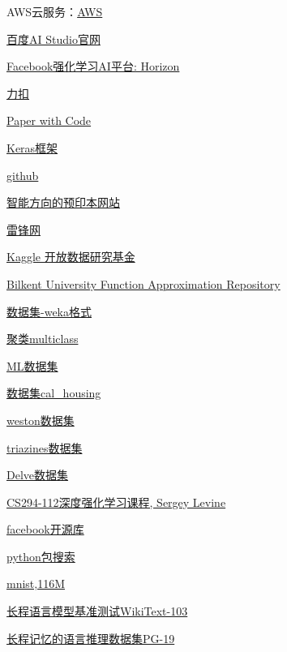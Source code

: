 AWS云服务：\href{https://aws.amazon.com/cn/}{AWS}

\href{http://aistudio.baidu.com/#/projectoverview}{百度AI Studio官网}

\href{https://github.com/openstack/horizon}{Facebook强化学习AI平台: Horizon}

\href{https://leetcode-cn.com/problemset/all/}{力扣}

\href{https://www.paperswithcode.com/}{Paper with Code}

\href{https://keras.io/zh/}{Keras框架}

\href{https://github.com/}{github}

\href{https://arxiv.org/}{智能方向的预印本网站}

\href{https://www.leiphone.com/category/ai}{雷锋网}

\href{https://www.kaggle.com/}{Kaggle 开放数据研究基金}

\href{http://funapp.cs.bilkent.edu.tr/DataSets/}{Bilkent University Function Approximation Repository}

\href{http://www.cs.waikato.ac.nz/ml/weka/datasets.html}{数据集-weka格式}

\href{http://www.csie.ntu.edu.tw/~cjlin/libsvmtools/datasets/multiclass.html}{聚类multiclass}

\href{http://archive.ics.uci.edu//ml/datasets}{ML数据集}

\href{http://www.dcc.fc.up.pt/ltorgo/Regression/cal_housing.html}{数据集cal\_housing}

\href{http://leon.bottou.org/papers/bordes-ertekin-weston-bottou-2005}{weston数据集}

\href{http://mldata.org/repository/data/viewslug/regression-datasets-triazines/}{triazines数据集}

\href{http://www.cs.toronto.edu/~delve/data/datasets.html}{Delve数据集}

\href{http://rail.eecs.berkeley.edu/deeprlcourse/}{CS294-112深度强化学习课程, Sergey Levine}

\href{https://github.com/facebookresearch}{facebook开源库}

\href{https://github.com/}{python包搜索}

\href{http://yann.lecun.com/exdb/mnist/t10k-images-idx3-ubyte.gz}{mnist,116M}

\href{http://academictorrents.com/details/a4fee5547056c845e31ab952598f43b42333183c}{长程语言模型基准测试WikiText-103}

\href{https://console.cloud.google.com/storage/browser/deepmind-gutenberg}{长程记忆的语言推理数据集PG-19} \cite{raecompressive2019}

